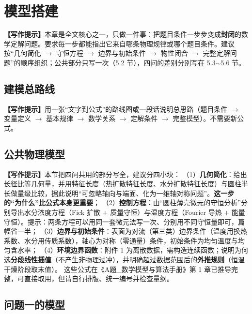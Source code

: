\documentclass[12pt,a4paper]{article}
\newcommand{\prompt}[1]{\par\noindent\textbf{【写作提示】}#1\par}      %
\begin{document}
\section{模型搭建}

\prompt{本章是全文核心之一，只做一件事：把题目条件一步步变成\textbf{封闭}的数学定解问题。要求每一步都能指出它来自哪条物理规律或哪个题目条件。建议按“几何简化 $\rightarrow$ 守恒方程 $\rightarrow$ 边界与初始条件 $\rightarrow$ 物性闭合 $\rightarrow$ 完整定解问题”的顺序组织；公共部分只写一次（5.2 节），四问的差别分别写在 5.3$\sim$5.6 节。}

\subsection{建模总路线}

\prompt{用一张“文字到公式”的路线图或一段话说明总思路（题目条件 $\rightarrow$ 变量定义 $\rightarrow$ 基本规律 $\rightarrow$ 数学关系 $\rightarrow$ 定解条件 $\rightarrow$ 完整模型）。不需要新公式。}

\subsection{公共物理模型}

\prompt{本节把四问共用的部分写全，建议分四小块：
（1）\textbf{几何简化}：给出长径比等几何量，并用特征长度（热扩散特征长度、水分扩散特征长度）与圆柱半长做量级比较，据此说明“可忽略轴向与端面、化为一维轴对称问题”。\textbf{这一步的“为什么”比公式本身更重要}；
（2）\textbf{控制方程}：由“圆柱薄壳微元的守恒分析”分别导出水分浓度方程（Fick 扩散 + 质量守恒）与温度方程（Fourier 导热 + 能量守恒）。提示：两条方程可以用同一套微元法写一次、分别用不同守恒量即可，篇幅省一半；
（3）\textbf{边界与初始条件}：表面为对流（第三类）边界条件（温度用换热系数、水分用传质系数），轴心为对称（零通量）条件，初始条件为均匀温度与均匀含水率；
（4）\textbf{环境边界函数}：附件 1 为离散数据，需构造连续函数；说明为何选\textbf{分段线性插值}（不产生非物理过冲），并明确超过数据范围后的\textbf{外推规则}（恒温干燥阶段取末值）。
这些公式在《A题\_数学模型与算法手册》第 1 章已推导完整，可直接取用，但请自行排版、统一编号并检查量纲。}


\subsection{问题一的模型}
\end{document}
